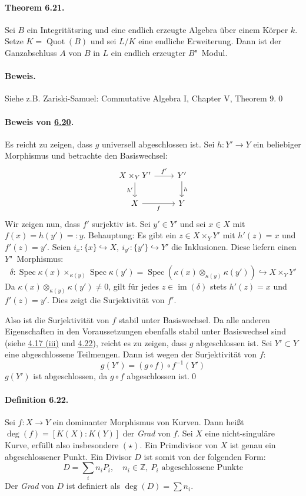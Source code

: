 \paragraph{Theorem 6.21.}\label{6.21} Sei $B$ ein Integritätsring und eine endlich erzeugte Algebra über einem Körper $k$. Setze $K=\operatorname{Quot}(B)$ und sei $L/K$ eine endliche Erweiterung. Dann ist der Ganzabschluss $A$ von $B$ in $L$ ein endlich erzeugter $B$"~Modul.

\paragraph{Beweis.} Siehe z.B. Zariski-Samuel: Commutative Algebra I, Chapter V, Theorem 9.\qed

\paragraph{Beweis von \hyperref[6.20]{6.20}.} Es reicht zu zeigen, dass $g$ universell abgeschlossen ist. Sei $h:Y'\to Y$ ein beliebiger Morphismus und betrachte den Basiswechsel:
\[\begin{tikzcd}
X\times_Y Y' \ar[r, "f'"]\ar[d, "h'"'] & Y' \ar[d, "h"]\\
X\ar[r, "f"'] & Y
\end{tikzcd} \]
Wir zeigen nun, dass $f'$ surjektiv ist. Sei $y'\in Y'$ und sei $x\in X$ mit $f(x)=h(y')=:y$. Behauptung: Es gibt ein $z\in X\times_YY'$ mit $h'(z)=x$ und $f'(z)=y'$. Seien $i_x:\{x\}\hookrightarrow X,\ i_{y'}:\{y'\}\hookrightarrow Y'$ die Inklusionen. Diese liefern einen $Y$"~Morphismus:
\[\delta : \operatorname{Spec}\kappa(x)\times_{\kappa(y)}\operatorname{Spec}\kappa(y') = \operatorname{Spec}(\kappa(x)\otimes_{\kappa(y)}\kappa(y'))\hookrightarrow X\times_YY' \]
Da $\kappa(x)\otimes_{\kappa(y)}\kappa(y')\neq 0$, gilt für jedes $z\in\operatorname{im}(\delta)$ stets $h'(z)=x$ und $f'(z)=y'$. Dies zeigt die Surjektivität von $f'$.

Also ist die Surjektivität von $f$ stabil unter Basiswechsel. Da alle anderen Eigenschaften in den Voraussetzungen ebenfalls stabil unter Basiswechsel sind (siehe \hyperref[4.17]{4.17 (iii)} und \hyperref[4.22]{4.22}), reicht es zu zeigen, dass $g$ abgeschlossen ist. Sei $Y'\subset Y$ eine abgeschlossene Teilmengen. Dann ist wegen der Surjektivität von $f$:
\[g(Y')=(g\circ f)\circ f^{-1}(Y') \]
$g(Y')$ ist abgeschlossen, da $g\circ f$ abgeschlossen ist.\qed

\paragraph{Definition 6.22.}\label{6.22} Sei $f:X\to Y$ ein dominanter Morphismus von Kurven. Dann heißt $\deg(f)=[K(X):K(Y)]$ der \textit{Grad} von $f$. Sei $X$ eine nicht-singuläre Kurve, erfüllt also insbesondere $(\star)$. Ein Primdivisor von $X$ ist genau ein abgeschlossener Punkt. Ein Divisor $D$ ist somit von der folgenden Form:
\[D=\sum_i n_iP_i,\quad n_i\in\mathbb{Z},\ P_i\text{ abgeschlossene Punkte} \]
Der \textit{Grad} von $D$ ist definiert als $\deg(D)=\sum n_i$.

